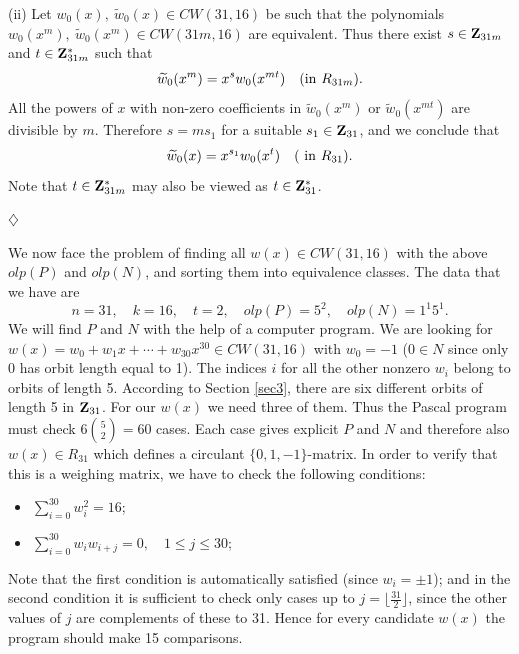{{{\begin{enumerate}
\begin{pr}
{(ii)    Let $w_0(x), \ \widetilde{w}_0(x) \in CW(31,16)$ be such that the 
	polynomials $w_0(x^m), \ \widetilde{w}_0(x^m) \in CW(31m,16)$ are equivalent. 
	Thus there exist  $s \in {\bf Z}_{31m}$ and $t \in {\bf Z}^{*}_{31m}$ 
	such that 
		$$ \widetilde{w}_{0}(x^m)=x^{s}w_0(x^{mt}) \quad ({\rm 
in} \ R_{31m}).$$ 
	All the powers of $x$ with non-zero coefficients in $\widetilde{w}_{0}(x^m)$ 
	or $\widetilde{w}_{0}(x^{mt})$ are divisible by $m$. Therefore $s=ms_1$ 
	for a suitable $s_1 \in {\bf Z}_{31}$, and we conclude that 
	     $$ \widetilde{w}_{0}(x)=x^{s_1}w_0(x^{t}) \quad ({\rm \ in \ } R_{31}).$$ 
	Note that $t \in {\bf Z}^{*}_{31m}$ may also be viewed as $t \in {\bf Z}^{*}_{31}$. 
		   \begin{flushright}
				$\diamondsuit$
		   \end{flushright}
     
     }
\end{pr}

	 We now face the problem of finding all $w(x) \in CW(31,16)$ 
	 with the above $olp(P)$ and $olp(N)$, and sorting them into equivalence 
	 classes. The data that we have are
	      $$n=31, \quad k=16, \quad t=2, \quad olp(P)=5^2, \quad olp(N)=1^{1}5^1.$$ 
	 We will find $P$ and $N$ with the help of a computer program.               
	 We are looking for 
	 $w(x)=w_{0}+w_{1}x+\cdots+w_{30}x^{30} \in CW(31,16)$ with $w_{0}=-1$ 
	 ($0 \in N$ since only 0 has orbit length equal to 1). The indices $i$ for all 
	 the other nonzero $w_i$ belong to orbits of length 5. 
	 According to Section \ref{sec3}, there are six different orbits of length 5
	 in ${\bf Z}_{31}$. For our $w(x)$ we need three of them. 
	 Thus the Pascal program must check $6{5 \choose 2}=60$ cases.
	 Each case gives explicit $P$ and $N$ and therefore also $w(x) \in R_{31}$ 
	 which defines a circulant $\{0,1,-1\}$-matrix. 
	 In order to verify that this is a weighing matrix, we have to check 
	 the following conditions:
	 \begin{itemize}
	\item $\sum_{i=0}^{30}w^2_i=16 $;
	\item $\sum_{i=0}^{30}w_{i}w_{i+j} =0, \quad  1 \leq j \leq 30$;
	 \end{itemize}
	 Note that the first condition is automatically satisfied (since 
	 $w_i=\pm 1$); and in the second condition it is sufficient to check only cases up to 
	 $j=\lfloor \frac{31}{2} \rfloor$, since the other values of $j$ are complements of 
	 these to 31. Hence for every candidate $w(x)$
	 the program should make 15 comparisons. 
	 

\end{enumerate}}}}
